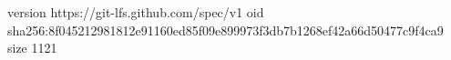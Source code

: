 version https://git-lfs.github.com/spec/v1
oid sha256:8f045212981812e91160ed85f09e899973f3db7b1268ef42a66d50477c9f4ca9
size 1121
